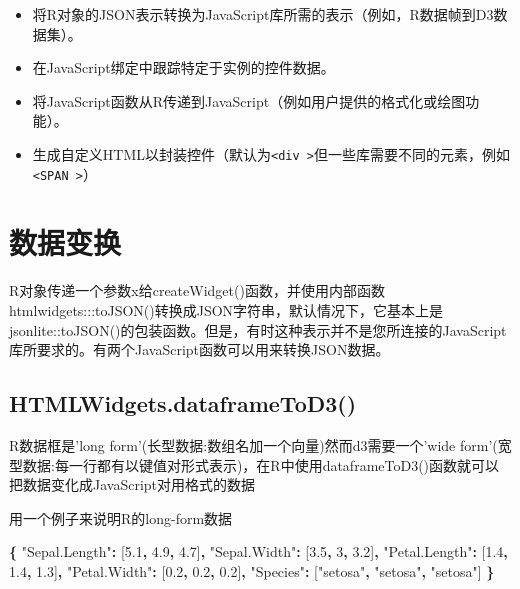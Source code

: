 \documentclass[]{book}
\newenvironment{Shaded}{\begin{snugshade}}{\end{snugshade}}
\newcommand{\DecValTok}[1]{\textcolor[rgb]{0.00,0.00,0.81}{#1}}
\newcommand{\FloatTok}[1]{\textcolor[rgb]{0.00,0.00,0.81}{#1}}
\newcommand{\StringTok}[1]{\textcolor[rgb]{0.31,0.60,0.02}{#1}}
\newcommand{\OperatorTok}[1]{\textcolor[rgb]{0.81,0.36,0.00}{\textbf{#1}}}
\newcommand{\NormalTok}[1]{#1}
\theoremstyle{definition}
\theoremstyle{definition}
\theoremstyle{definition}
\theoremstyle{remark}
\begin{document}
\begin{itemize}
\item
  将R对象的JSON表示转换为JavaScript库所需的表示（例如，R数据帧到D3数据集）。
\item
  在JavaScript绑定中跟踪特定于实例的控件数据。
\item
  将JavaScript函数从R传递到JavaScript（例如用户提供的格式化或绘图功能）。
\item
  生成自定义HTML以封装控件（默认为\texttt{\textless{}div\ \textgreater{}}但一些库需要不同的元素，例如\texttt{\textless{}SPAN\ \textgreater{}}）
\end{itemize}

\section{数据变换}

R对象传递一个参数x给createWidget()函数，并使用内部函数htmlwidgets:::toJSON()转换成JSON字符串，默认情况下，它基本上是jsonlite::toJSON()的包装函数。但是，有时这种表示并不是您所连接的JavaScript库所要求的。有两个JavaScript函数可以用来转换JSON数据。

\subsection{HTMLWidgets.dataframeToD3()}\label{htmlwidgets.dataframetod3}

R数据框是'long form'(长型数据:数组名加一个向量)然而d3需要一个'wide
form'(宽型数据:每一行都有以键值对形式表示)，在R中使用dataframeToD3()函数就可以把数据变化成JavaScript对用格式的数据

用一个例子来说明R的long-form数据

\begin{Shaded}
\begin{Highlighting}[]
\OperatorTok{\{}
  \StringTok{"Sepal.Length"}\OperatorTok{:}\NormalTok{ [}\FloatTok{5.1}\OperatorTok{,} \FloatTok{4.9}\OperatorTok{,} \FloatTok{4.7}\NormalTok{]}\OperatorTok{,}
  \StringTok{"Sepal.Width"}\OperatorTok{:}\NormalTok{ [}\FloatTok{3.5}\OperatorTok{,} \DecValTok{3}\OperatorTok{,} \FloatTok{3.2}\NormalTok{]}\OperatorTok{,}
  \StringTok{"Petal.Length"}\OperatorTok{:}\NormalTok{ [}\FloatTok{1.4}\OperatorTok{,} \FloatTok{1.4}\OperatorTok{,} \FloatTok{1.3}\NormalTok{]}\OperatorTok{,}
  \StringTok{"Petal.Width"}\OperatorTok{:}\NormalTok{ [}\FloatTok{0.2}\OperatorTok{,} \FloatTok{0.2}\OperatorTok{,} \FloatTok{0.2}\NormalTok{]}\OperatorTok{,}
  \StringTok{"Species"}\OperatorTok{:}\NormalTok{ [}\StringTok{"setosa"}\OperatorTok{,} \StringTok{"setosa"}\OperatorTok{,} \StringTok{"setosa"}\NormalTok{]}
\OperatorTok{\}} 
\end{Highlighting}
\end{Shaded}
\end{document}
